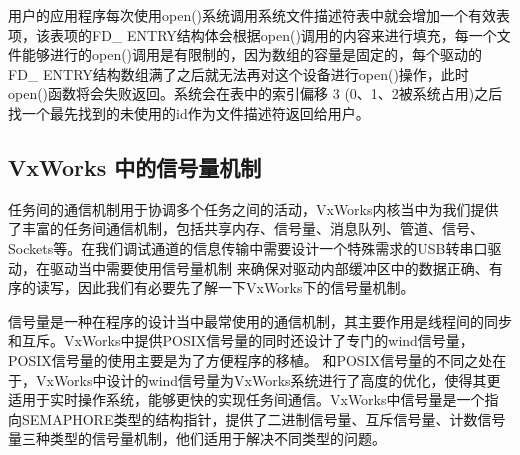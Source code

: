 用户的应用程序每次使用open()系统调用系统文件描述符表中就会增加一个有效表项，该表项的FD\_ ENTRY结构体会根据open()调用的内容来进行填充，每一个文件能够进行的open()调用是有限制的，因为数组的容量是固定的，每个驱动的FD\_ ENTRY结构数组满了之后就无法再对这个设备进行open()操作，此时 open()函数将会失败返回\cite{VxWorks内核解读}。系统会在表中的索引偏移 3 (0、1、2被系统占用)之后找一个最先找到的未使用的id作为文件描述符返回给用户。
	
\subsection{VxWorks 中的信号量机制}
	
	任务间的通信机制用于协调多个任务之间的活动，VxWorks内核当中为我们提供了丰富的任务间通信机制，包括共享内存、信号量、消息队列、管道、信号、Sockets等\cite{胡明民2012基于实时操作系统}\cite{冯云贺2014基于}。在我们调试通道的信息传输中需要设计一个特殊需求的USB转串口驱动，在驱动当中需要使用信号量机制
	来确保对驱动内部缓冲区中的数据正确、有序的读写，因此我们有必要先了解一下VxWorks下的信号量机制。

	
	信号量是一种在程序的设计当中最常使用的通信机制，其主要作用是线程间的同步和互斥。VxWorks中提供POSIX信号量的同时还设计了专门的wind信号量，POSIX信号量的使用主要是为了方便程序的移植。
	和POSIX信号量的不同之处在于，VxWorks中设计的wind信号量为VxWorks系统进行了高度的优化，使得其更适用于实时操作系统，能够更快的实现任务间通信。VxWorks中信号量是一个指向SEMAPHORE类型的结构指针，提供了二进制信号量、互斥信号量、计数信号量三种类型的信号量机制，他们适用于解决不同类型的问题。
	
